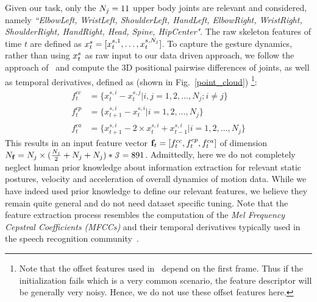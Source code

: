 Given our task, only  the $N_j=11$ upper body joints are relevant and
considered, namely \emph{``ElbowLeft, WristLeft, ShoulderLeft, HandLeft, ElbowRight, WristRight, ShoulderRight, HandRight, Head, Spine, HipCenter"}.
%
The raw skeleton features of time $t$ are defined as $x^s_t=[x_t^{s,1}, \ldots, x_t^{s, N_j}]$.
To capture the gesture dynamics, rather than using $x^s_t$ as raw input to our data driven approach,
we follow the approach of~\cite{diwucvpr14} and compute the 3D positional pairwise differences of joints, as well as temporal derivatives, defined as (shown in Fig.~\ref{point_cloud}) \footnote{Note that the offset features used in~\cite{diwucvpr14} depend on the first frame.
Thus if the initialization fails which is a very common scenario, the feature descriptor will be generally very noisy.
Hence, we do not use these offset features here.}:
\begin{align}
f^{cc}_t&=\{x_t^{s,i}-x_t^{s,j} | i,j=1,2,\ldots, N_j; i\neq j\} \label{sk_features_1}\\
f^{cp}_t&=\{x_{t+1}^{s,i}-x_t^{s,i} |  i=1,2,\ldots, N_j\} \label{sk_features_2}\\
f^{ca}_t&=\{x_{t+1}^{s,i} - 2 \times x_t^{s,i} + x_{t-1}^{s,i} | i=1,2,\ldots, N_j  \} \label{sk_features_3}
\end{align}
%
This results in an input feature vector $\mathbf{f}_t=[f^{cc}_t, f^{cp}_t, f^{ca}_t]$ of dimension $N_{\mathbf{f}}=N_j \times( \frac{ N_j}{2} + N_j + N_j)*\mathit{3}=891$.
Admittedly, here we do not completely neglect human prior knowledge about information extraction for relevant static postures, velocity and acceleration of overall dynamics of motion data.
While we have indeed used prior knowledge to define our relevant features, we believe they remain quite general and do not need dataset specific tuning.
Note that the feature extraction process resembles the computation of the
\emph{Mel Frequency Cepstral Coefficients (MFCCs)} and their temporal derivatives
typically used in the  speech recognition community~\cite{mohamed2012acoustic}.

